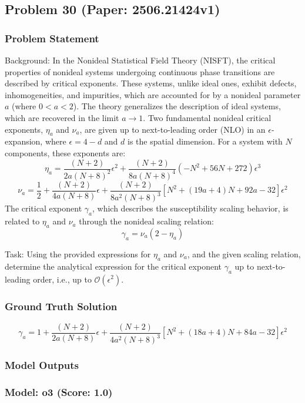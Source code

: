\documentclass[10pt]{article}
\begin{document}
\newpage
\subsection*{Problem 30 (Paper: 2506.21424v1)}
\subsubsection*{Problem Statement}
Background:
In the Nonideal Statistical Field Theory (NISFT), the critical properties of nonideal systems undergoing continuous phase transitions are described by critical exponents. These systems, unlike ideal ones, exhibit defects, inhomogeneities, and impurities, which are accounted for by a nonideal parameter $a$ (where $0 < a < 2$). The theory generalizes the description of ideal systems, which are recovered in the limit $a \rightarrow 1$. Two fundamental nonideal critical exponents, $\eta_a$ and $\nu_a$, are given up to next-to-leading order (NLO) in an $\epsilon$-expansion, where $\epsilon = 4 - d$ and $d$ is the spatial dimension. For a system with $N$ components, these exponents are:
$$ \eta_{a} = \dfrac{(N + 2)}{2a(N + 8)^{2}}\epsilon^{2} + \dfrac{(N + 2)}{8a(N + 8)^{4}}(-N^{2} + 56N + 272)\epsilon^{3} $$
$$ \nu_{a} = \dfrac{1}{2} + \dfrac{(N + 2)}{4a(N + 8)}\epsilon + \dfrac{(N + 2)}{8a^{2}(N + 8)^{3}}[N^{2} + (19a + 4)N + 92a - 32]\epsilon^{2} $$
The critical exponent $\gamma_a$, which describes the susceptibility scaling behavior, is related to $\eta_a$ and $\nu_a$ through the nonideal scaling relation:
$$ \gamma_{a} = \nu_{a}(2 - \eta_{a}) $$

Task:
Using the provided expressions for $\eta_a$ and $\nu_a$, and the given scaling relation, determine the analytical expression for the critical exponent $\gamma_a$ up to next-to-leading order, i.e., up to $\mathcal{O}(\epsilon^2)$.

\subsubsection*{Ground Truth Solution}
\[ \boxed{\gamma_{a} = 1 + \dfrac{(N + 2)}{2a(N + 8)}\epsilon + \dfrac{(N + 2)}{4a^{2}(N + 8)^{3}}[N^{2} + (18a + 4)N + 84a - 32]\epsilon^{2}} \]

\subsubsection*{Model Outputs}
\subsubsection*{Model: o3 (Score: 1.0)}
\end{document}
